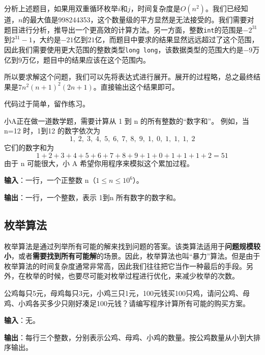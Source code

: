\documentclass{article}
\begin{document}
\begin{soln}
  分析上述题目，如果用双重循环枚举$i$和$j$，时间复杂度是$O(n^2)$。我们已经知道，$n$的最大值是998244353，这个数量级的平方显然是无法接受的。我们需要对题目进行分析，推导出一个更高效的计算方法。另一方面，整数\texttt{int}的范围是$-2^{31}$到$2^{31}-1$，大约是$-21$亿到$21$亿，而题目中要求的结果显然远远超过了这个范围，因此我们需要使用更大范围的整数类型\texttt{long long}，该数据类型的范围大约是$-9$万亿到$9$万亿，题目中的结果应该在这个范围内。

  所以要求解这个问题，我们可以先将表达式进行展开。展开的过程略，总之最终结果是$7n^2(n+1)^2(2n+1)$。直接输出这个结果即可。

  代码过于简单，留作练习。
\end{soln}

\begin{problem}
  小A正在做一道数学题，需要计算从 1 到 n 的所有整数的“数字和”。
  例如，当 n=12 时，1到12 的数字依次为
  $$1,\;2,\;3,\;4,\;5,\;6,\;7,\;8,\;9,\;1,\;0,\;1,\;1,\;1,\;2$$
  它们的数字和为
  $$1+2+3+4+5+6+7+8+9+1+0+1+1+1+2=51$$
  由于 n 可能很大，小 A 希望你用程序来模拟这个累加过程。

  \textbf{输入}：一行，一个正整数 n（$1\le n\le 10^6$）。

  \textbf{输出}：一行，一个整数，表示 1到n 所有数字的数字和。
\end{problem}

\subsection{枚举算法}

枚举算法是通过列举所有可能的解来找到问题的答案。该类算法适用于\textbf{问题规模较小}，或者\textbf{需要找到所有可能解}的场景。因此，枚举算法也叫“暴力”算法。但是由于枚举算法的时间复杂度通常非常高，因此我们往往把它当作一种最后的手段。另外，在枚举的时候，也要尽可能对枚举过程进行优化，来减少枚举的次数。

\begin{example}
  公鸡每只5元，母鸡每只3元，小鸡三只1元，100元钱买100只鸡，请问公鸡、母鸡、小鸡各买多少只刚好凑足100元钱？请编写程序计算所有可能的购买方案。

  \textbf{输入}：无。

  \textbf{输出}：每行三个整数，分别表示公鸡、母鸡、小鸡的数量。按公鸡数量从小到大排序输出。
\end{example}
\end{document}

